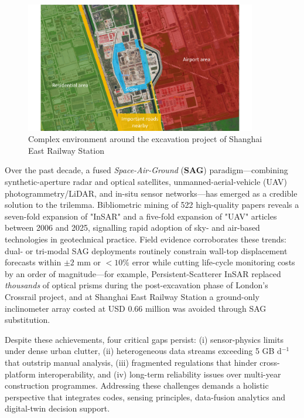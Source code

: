 \documentclass[preprint,11pt,authoryear,3p]{elsarticle}
\begin{document}
\begin{figure}
    \centering
    \includegraphics[width=0.9\textwidth]{imgs/Multi_chars.pdf}
    \caption{Complex environment around the excavation project of Shanghai East Railway Station}
    \label{fig:complexEnvironment}
\end{figure}

Over the past decade, a fused \textit{Space-Air-Ground} (\textbf{SAG}) paradigm—combining synthetic-aperture radar and optical satellites, unmanned-aerial-vehicle (UAV) photogrammetry/LiDAR, and in-situ sensor networks—has emerged as a credible solution to the trilemma. Bibliometric mining of 522 high-quality papers reveals a seven-fold expansion of "InSAR" and a five-fold expansion of "UAV" articles between 2006 and 2025, signalling rapid adoption of sky- and air-based technologies in geotechnical practice. Field evidence corroborates these trends: dual- or tri-modal SAG deployments routinely constrain wall-top displacement forecasts within $\pm2$ mm or $<10\%$ error while cutting life-cycle monitoring costs by an order of magnitude—for example, Persistent-Scatterer InSAR replaced \emph{thousands} of optical prisms during the post-excavation phase of London's Crossrail project, and at Shanghai East Railway Station a ground-only inclinometer array costed at USD 0.66 million was avoided through SAG substitution.

Despite these achievements, four critical gaps persist:
(i) sensor-physics limits under dense urban clutter,
(ii) heterogeneous data streams exceeding 5 GB d$^{-1}$ that outstrip manual analysis,
(iii) fragmented regulations that hinder cross-platform interoperability, and
(iv) long-term reliability issues over multi-year construction programmes.
Addressing these challenges demands a holistic perspective that integrates codes, sensing
principles, data-fusion analytics and digital-twin decision support.
\end{document}
